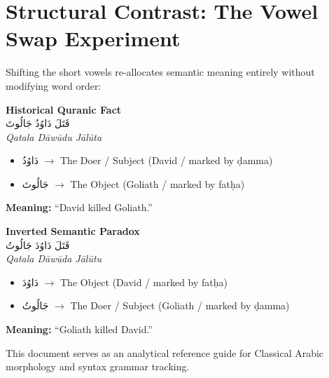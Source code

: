 \documentclass[11pt,a4paper]{article}
\begin{document}
\section{Structural Contrast: The Vowel Swap Experiment}
Shifting the short vowels re-allocates semantic meaning entirely without modifying word order:

\vspace{0.3cm}

\begin{center}
\begin{minipage}{0.48\textwidth}
    \centering
    \textbf{Historical Quranic Fact} \\[0.5em]
    {\Large \textarabic{قَتَلَ دَاوُدُ جَالُوتَ}} \\[0.5em]
    \small \textit{Qatala Dāwūdu Jālūta}
    \begin{itemize}
        \item[] \textarabic{دَاوُدُ} $\rightarrow$ The Doer / Subject (David / marked by ḍamma)
        \item[] \textarabic{جَالُوتَ} $\rightarrow$ The Object (Goliath / marked by fatḥa)
    \end{itemize}
    \vspace{0.5em}
    \textbf{Meaning:} ``David killed Goliath.''
\end{minipage}
\hfill
\begin{minipage}{0.48\textwidth}
    \centering
    \textbf{Inverted Semantic Paradox} \\[0.5em]
    {\Large \textarabic{قَتَلَ دَاوُدَ جَالُوتُ}} \\[0.5em]
    \small \textit{Qatala Dāwūda Jālūtu}
    \begin{itemize}
        \item[] \textarabic{دَاوُدَ} $\rightarrow$ The Object (David / marked by fatḥa)
        \item[] \textarabic{جَالُوتُ} $\rightarrow$ The Doer / Subject (Goliath / marked by ḍamma)
    \end{itemize}
    \vspace{0.5em}
    \textbf{Meaning:} ``Goliath killed David.''
\end{minipage}
\end{center}

\vspace{1.5cm}
\begin{center}
    \small\color{gray} This document serves as an analytical reference guide for Classical Arabic morphology and syntax grammar tracking.
\end{center}
\end{document}
